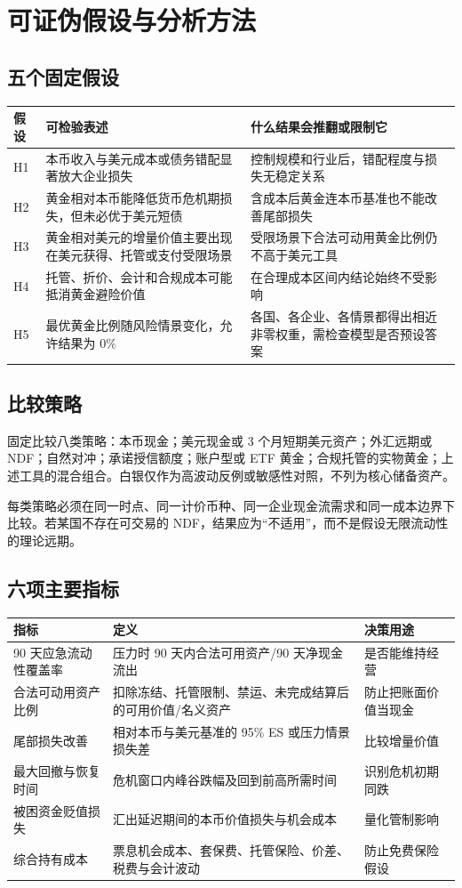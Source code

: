 \documentclass[UTF8,12pt,openany]{ctexbook}
\begin{document}
\chapter{可证伪假设与分析方法}

\section{五个固定假设}
\begin{longtable}{p{1.2cm}p{6.4cm}p{6.1cm}}
\toprule
\textbf{假设} & \textbf{可检验表述} & \textbf{什么结果会推翻或限制它}\\
\midrule
H1 & 本币收入与美元成本或债务错配显著放大企业损失 & 控制规模和行业后，错配程度与损失无稳定关系\\
H2 & 黄金相对本币能降低货币危机期损失，但未必优于美元短债 & 含成本后黄金连本币基准也不能改善尾部损失\\
H3 & 黄金相对美元的增量价值主要出现在美元获得、托管或支付受限场景 & 受限场景下合法可动用黄金比例仍不高于美元工具\\
H4 & 托管、折价、会计和合规成本可能抵消黄金避险价值 & 在合理成本区间内结论始终不受影响\\
H5 & 最优黄金比例随风险情景变化，允许结果为 0\% & 各国、各企业、各情景都得出相近非零权重，需检查模型是否预设答案\\
\bottomrule
\end{longtable}

\section{比较策略}
固定比较八类策略：本币现金；美元现金或 3 个月短期美元资产；外汇远期或 NDF；自然对冲；承诺授信额度；账户型或 ETF 黄金；合规托管的实物黄金；上述工具的混合组合。白银仅作为高波动反例或敏感性对照，不列为核心储备资产。

每类策略必须在同一时点、同一计价币种、同一企业现金流需求和同一成本边界下比较。若某国不存在可交易的 NDF，结果应为“不适用”，而不是假设无限流动性的理论远期。

\section{六项主要指标}
\begin{longtable}{p{3.4cm}p{6.2cm}p{3.8cm}}
\toprule
\textbf{指标} & \textbf{定义} & \textbf{决策用途}\\
\midrule
90 天应急流动性覆盖率 & 压力时 90 天内合法可用资产/90 天净现金流出 & 是否能维持经营\\
合法可动用资产比例 & 扣除冻结、托管限制、禁运、未完成结算后的可用价值/名义资产 & 防止把账面价值当现金\\
尾部损失改善 & 相对本币与美元基准的 95\% ES 或压力情景损失差 & 比较增量价值\\
最大回撤与恢复时间 & 危机窗口内峰谷跌幅及回到前高所需时间 & 识别危机初期同跌\\
被困资金贬值损失 & 汇出延迟期间的本币价值损失与机会成本 & 量化管制影响\\
综合持有成本 & 票息机会成本、套保费、托管保险、价差、税费与会计波动 & 防止免费保险假设\\
\bottomrule
\end{longtable}
\end{document}
